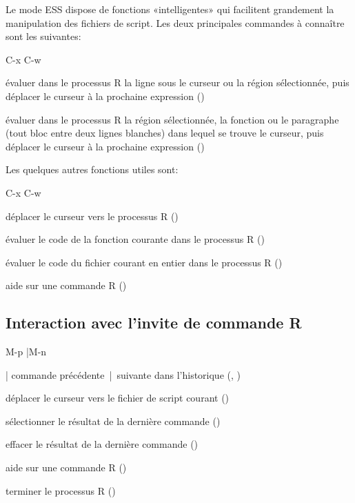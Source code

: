 Le mode ESS dispose de fonctions «intelligentes» qui facilitent
grandement la manipulation des fichiers de script. Les deux
principales commandes à connaître sont les suivantes:
\begin{ttscript}{C-x C-w}
  \raggedright
\item[\code{C-RET}] évaluer dans le processus R la ligne sous le
  curseur ou la région sélectionnée, puis déplacer le curseur à la
  prochaine expression ()
\item[\code{C-c C-c}] évaluer dans le processus R la région
  sélectionnée, la fonction ou le paragraphe (tout bloc entre deux
  lignes blanches) dans lequel se trouve le curseur, puis déplacer le
  curseur à la prochaine expression
  ()
\end{ttscript}
Les quelques autres fonctions utiles sont:
\begin{ttscript}{C-x C-w}
  \raggedright
\item[\code{C-c C-z}] déplacer le curseur vers le processus R
  ()
\item[\code{C-c C-f}] évaluer le code de la fonction courante dans
  le processus R ()
\item[\code{C-c C-l}] évaluer le code du fichier courant en entier dans
  le processus R ()
\item[\code{C-c C-v}] aide sur une commande R
  ()
\end{ttscript}

\subsection{Interaction avec l'invite de commande R}
\label{sec:emacs+ess:commandes:invite}

\begin{ttscript}{M-p |M-n}
  \raggedright
\item[\code{M-p} | \code{M-n}] commande précédente~|~suivante
  dans l'historique (,
  )
\item[\code{C-c C-z}] déplacer le curseur vers le fichier de script
  courant ()
\item[\code{M-h}] sélectionner le résultat de la dernière commande
  ()
\item[\code{C-c C-o}] effacer le résultat de la dernière commande
  ()
\item[\code{C-c C-v}] aide sur une commande R
  ()
\item[\code{C-c C-q}] terminer le processus R ()
\end{ttscript}

